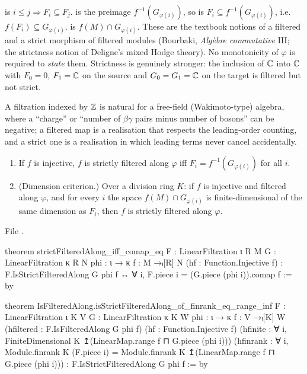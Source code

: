 \begin{dictionary}
 is $i\le j\Rightarrow F_i\subseteq F_j$. \allowbreak{}\allowbreak{} is the
preimage $f^{-1}(G_{\varphi(i)})$, so  is $F_i\subseteq f^{-1}(G_{\varphi(i)})$,
i.e.\ $f(F_i)\subseteq G_{\varphi(i)}$. \allowbreak{}\allowbreak{} is $f(M)\cap
G_{\varphi(i)}$. These are the textbook notions of a filtered and a strict morphism of filtered modules
(Bourbaki, \emph{Alg\`ebre commutative} III; the strictness notion of Deligne's mixed Hodge theory). No
monotonicity of $\varphi$ is required to \emph{state} them. Strictness is genuinely stronger: the
inclusion of ${\mathbb{C}}$ into ${\mathbb{C}}$ with $F_0 = 0$, $F_1={\mathbb{C}}$ on the source and $G_0 = G_1 = {\mathbb{C}}$ on the target is
filtered but not strict.
\end{dictionary}

\begin{physics}
A filtration indexed by ${\mathbb{Z}}$ is natural for a free-field (Wakimoto-type) algebra, where a ``charge'' or ``number of $\beta\gamma$
pairs minus number of bosons'' can be negative; a filtered map is a realisation that respects the leading-order counting, and a
strict one is a realisation in which leading terms never cancel accidentally.
\end{physics}


\begin{theorem}\label{l11:thm:strict}
\begin{enumerate}
\item If $f$ is injective, $f$ is strictly filtered along $\varphi$ iff $F_i = f^{-1}(G_{\varphi(i)})$
  for all $i$.
\item (Dimension criterion.) Over a division ring $K$: if $f$ is injective and filtered along
  $\varphi$, and for every $i$ the space $f(M)\cap G_{\varphi(i)}$ is finite-dimensional of the same
  dimension as $F_i$, then $f$ is strictly filtered along $\varphi$.
\end{enumerate}
\end{theorem}
\noindent File .
\begin{leancode}
theorem strictFilteredAlong_iff_comap_eq
    {F : LinearFiltration ι R M} {G : LinearFiltration κ R N}
    {phi : ι → κ} {f : M →ₗ[R] N} (hf : Function.Injective f) :
    F.IsStrictFilteredAlong G phi f ↔
      ∀ i, F.piece i = (G.piece (phi i)).comap f := by

theorem IsFilteredAlong.isStrictFilteredAlong_of_finrank_eq_range_inf
    {F : LinearFiltration ι K V} {G : LinearFiltration κ K W}
    {phi : ι → κ} {f : V →ₗ[K] W}
    (hfiltered : F.IsFilteredAlong G phi f) (hf : Function.Injective f)
    (hfinite : ∀ i, FiniteDimensional K ↥(LinearMap.range f ⊓ G.piece (phi i)))
    (hfinrank : ∀ i, Module.finrank K (F.piece i) =
      Module.finrank K ↥(LinearMap.range f ⊓ G.piece (phi i))) :
    F.IsStrictFilteredAlong G phi f := by
\end{leancode}

